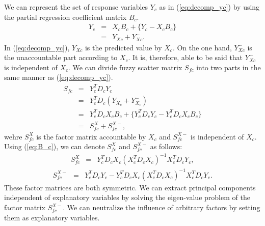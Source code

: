 \documentclass{article}
\begin{document}
We can represent the set of response variables $Y_c$ as in (\ref{eq:decomp_yc}) by using the partial regression coefficient matrix $B_c$.
%
\begin{eqnarray}
Y_c &=& X_c B_c + \{ Y_c - X_c B_c \} \nonumber \\
&=& Y_{Xc} + Y_{Xc}^{-}.
\label{eq:decomp_yc}
\end{eqnarray}
%
In (\ref{eq:decomp_yc}), $Y_{Xc}$ is the predicted value by $X_c$. On the one hand, $Y_{Xc}^{-}$ is the unaccountable part according to $X_c$. It is, therefore, able to be said that $Y_{Xc}^{-}$ is independent of $X_c$. We can divide fuzzy scatter matrix $S_{fc}$ into two parts in the same manner as (\ref{eq:decomp_yc}).
%
\begin{eqnarray}
S_{fc} &=& Y_c^T D_c Y_c \nonumber \\ 
&=& Y_c^T D_c (Y_{X_c}+Y_{X_c}^{-}) \nonumber \\
&=& Y_{c}^T D_c X_c B_c + \{Y_c^T D_c Y_c -Y_c^T D_c X_c B_c \} \nonumber \\
&=& S_{fc}^X + S_{fc}^{X-},
\label{eq:decomp_sfc}
\end{eqnarray}
%
wehre $S_{fc}^X$ is the factor matrix accountable by $X_c$ and $S_{fc}^{X-}$ is independent of $X_c$. Using (\ref{eq:B_c}), we can denote $S_{fc}^X$ and $S_{fc}^{X-}$ as follows: 
%
\begin{eqnarray}
S_{fc}^X &=&Y_{c}^T D_c X_c (X_c^T D_c X_c)^{-1} X_c^T D_c Y_c,
\end{eqnarray}
%
\begin{eqnarray}
S_{fc}^{X-} &=& Y_c^T D_c Y_c - Y_c^T D_c X_c (X_c^T D_c X_c)^{-1} X_c^T D_c Y_c.
\end{eqnarray}
%
These factor matrices are both symmetric. We can extract principal components independent of explanatory variables by solving the eigen-value problem of the factor matrix $S_{fc}^{X-}$. We can neutralize the influence of arbitrary factors by setting them as explanatory variables.

\end{document}
